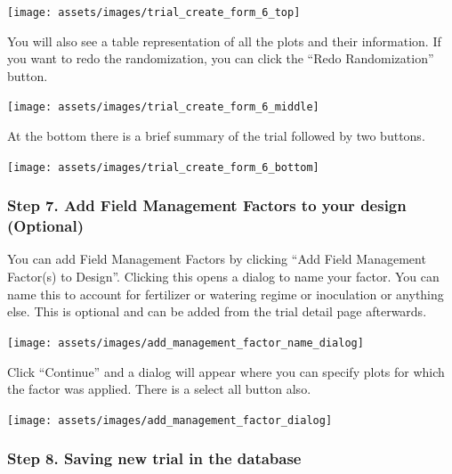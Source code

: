 \documentclass[
  12pt,
]{book}
\begin{document}
\begin{center}\texttt{[image: assets/images/trial\_create\_form\_6\_top]} \end{center}

You will also see a table representation of all the plots and their information. If you want to redo the randomization, you can click the ``Redo Randomization'' button.

\begin{center}\texttt{[image: assets/images/trial\_create\_form\_6\_middle]} \end{center}

At the bottom there is a brief summary of the trial followed by two buttons.

\begin{center}\texttt{[image: assets/images/trial\_create\_form\_6\_bottom]} \end{center}

\hypertarget{step-7.-add-field-management-factors-to-your-design-optional}{%
\subsubsection*{Step 7. Add Field Management Factors to your design (Optional)}\label{step-7.-add-field-management-factors-to-your-design-optional}}


You can add Field Management Factors by clicking ``Add Field Management Factor(s) to Design''. Clicking this opens a dialog to name your factor. You can name this to account for fertilizer or watering regime or inoculation or anything else. This is optional and can be added from the trial detail page afterwards.

\begin{center}\texttt{[image: assets/images/add\_management\_factor\_name\_dialog]} \end{center}

Click ``Continue'' and a dialog will appear where you can specify plots for which the factor was applied. There is a select all button also.

\begin{center}\texttt{[image: assets/images/add\_management\_factor\_dialog]} \end{center}

\hypertarget{step-8.-saving-new-trial-in-the-database}{%
\subsubsection*{Step 8. Saving new trial in the database}\label{step-8.-saving-new-trial-in-the-database}}
\end{document}
